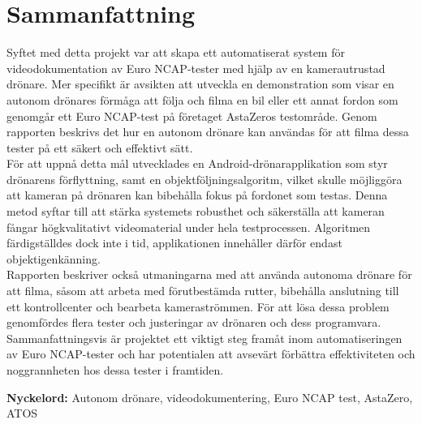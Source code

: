 \thispagestyle{plain}			%
\setlength{\parskip}{0pt plus 1.0pt}
\section*{Sammanfattning}
Syftet med detta projekt var att skapa ett automatiserat system för videodokumentation av Euro NCAP-tester med hjälp av en kamerautrustad drönare. Mer specifikt är avsikten att utveckla en demonstration som visar en autonom drönares förmåga att följa och filma en bil eller ett annat fordon som genomgår ett Euro NCAP-test på företaget AstaZeros testområde. Genom rapporten beskrivs det hur en autonom drönare kan användas för att filma dessa tester på ett säkert och effektivt sätt.
\\

För att uppnå detta mål utvecklades en Android-drönarapplikation som styr drönarens förflyttning, samt en objektföljningsalgoritm, vilket skulle möjliggöra att kameran på drönaren kan bibehålla fokus på fordonet som testas. Denna metod syftar till att stärka systemets robusthet och säkerställa att kameran fångar högkvalitativt videomaterial under hela testprocessen. Algoritmen färdigställdes dock inte i tid, applikationen innehåller därför endast objektigenkänning.
\\

Rapporten beskriver också utmaningarna med att använda autonoma drönare för att filma, såsom att arbeta med förutbestämda rutter, bibehålla anslutning till ett kontrollcenter och bearbeta kameraströmmen. För att lösa dessa problem genomfördes flera tester och justeringar av drönaren och dess programvara.
\\

Sammanfattningsvis är projektet ett viktigt steg framåt inom automatiseringen av Euro NCAP-tester och har potentialen att avsevärt förbättra effektiviteten och noggrannheten hos dessa tester i framtiden.


\vfill
\textbf{Nyckelord:} Autonom drönare, videodokumentering, Euro NCAP test, AstaZero, ATOS

\mbox{}